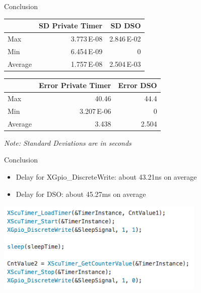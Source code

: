 \documentclass[pdf]{beamer}
\begin{document}
\begin{frame}{Conclusion}
  \begin{center}
    \begin{tabular}{lrr}
      & SD Private Timer & SD DSO\\
      \hline
      Max & 3.773\,E-08 & 2.846\,E-02\\
      Min & 6.454\,E-09 & 0\\
      Average & 1.757\,E-08 & 2.504\,E-03\\
      \hline
    \end{tabular}
  \end{center}

  \begin{center}
    \begin{tabular}{lrr}
      & Error Private Timer & Error DSO\\
      \hline
      Max & 40.46 & 44.4\\
      Min & 3.207\,E-06 & 0\\
      Average & 3.438 & 2.504\\
      \hline
    \end{tabular}
  \end{center}
  \center\small\emph{Note: Standard Deviations are in seconds}

\end{frame}

\begin{frame}{Conclusion}

  \begin{itemize}
    
  \item Delay for XGpio\_DiscreteWrite: about 43.21ns on average
  
  \item Delay for DSO: about 45.27ms on average

  \end{itemize}

  \centering
  \includegraphics[width=100mm]{code.png}

  
\end{frame}

\begin{frame}
  

  
\end{frame}
\end{document}
